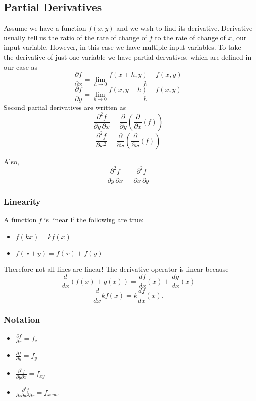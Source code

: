 \documentclass[12pt]{article}
\theoremstyle{plain} %
\theoremstyle{definition}
\theoremstyle{definition}
\theoremstyle{definition}
\theoremstyle{remark}
\newcommand{\ddx}{\frac{d}{dx}}
\begin{document}
\subsection{Partial Derivatives}
Assume we have a function $f(x,y)$ and we wish to find its derivative. Derivative usually tell us the ratio of the rate of change of $f$ to the rate of change of $x$, our input variable. However, in this case we have multiple input variables. To take the derivative of just one variable we have partial dervatives, which are defined in our case as
\[ \frac{\partial f}{\partial x} = \lim_{h\to 0} \frac{f(x+h,y) - f(x,y)}{h} \]
\[ \frac{\partial f}{\partial y} = \lim_{h\to 0} \frac{f(x,y+h) - f(x,y)}{h} \]
Second partial derivatives are written as
\[ \frac{\partial^2 f}{\partial y \, \partial x} = \frac{\partial}{\partial y}\left(\frac{\partial}{\partial x}(f)\right) \]
\[ \frac{\partial^2 f}{\partial x^2} = \frac{\partial}{\partial x}\left(\frac{\partial}{\partial x}(f)\right) \]

Also, \[\frac{\partial^2 f}{\partial y \, \partial x} = \frac{\partial^2 f}{\partial x \, \partial y}\]


\subsubsection{Linearity}
A function $f$ is linear if the following are true:
\begin{itemize}
    \item $f(kx) = kf(x)$
    \item $f(x+y) = f(x) + f(y).$
\end{itemize}
Therefore not all lines are linear!
The derivative operator is linear because
\[ \ddx (f(x)+g(x)) = \frac{df}{dx} (x) + \frac{dg}{dx} (x) \]
\[ \ddx kf(x) = k \frac{df}{dx}(x) .\]

\subsubsection{Notation}
\begin{itemize}
    \item $\frac{\partial f}{\partial x} = f_x$
    \item $\frac{\partial f}{\partial y} = f_y$
    \item $\frac{\partial^2 f}{\partial y \partial x} = f_{xy}$
    \item $\frac{\partial^4 f}{\partial z \partial w^2 \partial x} = f_{xwwz}$
\end{itemize}
\end{document}
